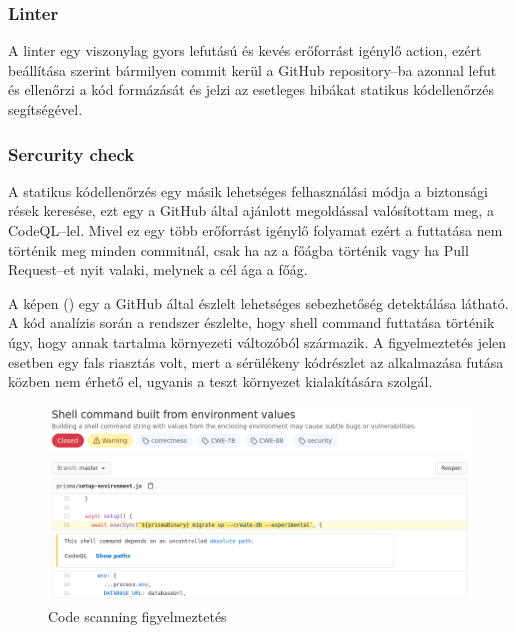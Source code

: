\subsubsection{Linter}
A linter egy viszonylag gyors lefutású és kevés erőforrást igénylő action, ezért beállítása szerint bármilyen commit kerül a GitHub repository–ba azonnal lefut és ellenőrzi a kód formázását és jelzi az esetleges hibákat statikus kódellenőrzés segítségével.


\subsubsection{Sercurity check}
A statikus kódellenőrzés egy másik lehetséges felhasználási módja a biztonsági rések keresése, ezt egy a GitHub által ajánlott megoldással valósítottam meg, a CodeQL–lel.
Mivel ez egy több erőforrást igénylő folyamat ezért a futtatása nem történik meg minden commitnál, csak ha az a főágba történik vagy ha Pull Request–et nyit valaki, melynek a cél ága a főág.

A képen () egy a GitHub által észlelt lehetséges sebezhetőség detektálása látható.
A kód analízis során a rendszer észlelte, hogy shell command futtatása történik úgy, hogy annak tartalma környezeti változóból származik.
A figyelmeztetés jelen esetben egy fals riasztás volt, mert a sérülékeny kódrészlet az alkalmazása futása közben nem érhető el, ugyanis a teszt környezet kialakítására szolgál.

\begin{figure}[!ht]
  \centering
  \includegraphics[width=150mm, keepaspectratio]{figures/security.png}
  \caption{Code scanning figyelmeztetés}
  \label{fig:securityCheck}
\end{figure}

